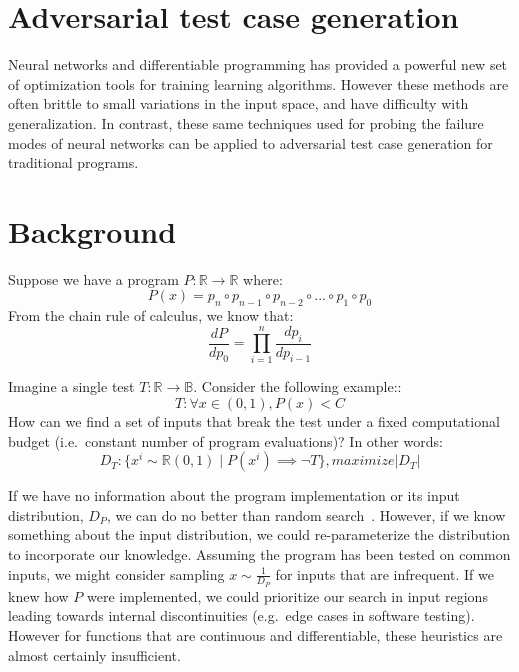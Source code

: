\documentclass[12pt,initial,twoside,maitrise]{dms}
\numberwithin{equation}{section}
\numberwithin{table}{chapter}
\numberwithin{figure}{chapter}
\begin{document}
\section{Adversarial test case generation}

Neural networks and differentiable programming has provided a powerful new set of optimization tools for training learning algorithms. However these methods are often brittle to small variations in the input space, and have difficulty with generalization. In contrast, these same techniques used for probing the failure modes of neural networks can be applied to adversarial test case generation for traditional programs.

\section{Background}

Suppose we have a program $P: \mathbb{R}\rightarrow\mathbb{R}$ where:
%
\begin{equation}
    P(x)=p_n \circ p_{n-1} \circ p_{n-2} \circ ... \circ p_1 \circ p_0
\end{equation}
%
From the chain rule of calculus, we know that:
%
\begin{equation}
    \frac{dP}{dp_0} = {\displaystyle \prod_{i=1}^{n} \frac{dp_{i}}{dp_{i-1}}}
\end{equation}

%
%
Imagine a single test $T: \mathbb{R} \rightarrow \mathbb{B}$. Consider the following example::
%
\begin{equation}
    T: \forall x \in (0, 1), P(x) < C
\end{equation}
%
How can we find a set of inputs that break the test under a fixed computational budget (i.e.\ constant number of program evaluations)? In other words:
%
\begin{equation}
    D_T: \{ x^i \sim \mathbb{R}(0, 1) \mid P(x^i) \implies \neg T \}, maximize |D_T|
\end{equation}
%

If we have no information about the program implementation or its input distribution, $D_P$, we can do no better than random search~\cite{wolpert1997no}. However, if we know something about the input distribution, we could re-parameterize the distribution to incorporate our knowledge. Assuming the program has been tested on common inputs, we might consider sampling $x \sim \frac{1}{D_P}$ for inputs that are infrequent. If we knew how $P$ were implemented, we could prioritize our search in input regions leading towards internal discontinuities (e.g.\ edge cases in software testing). However for functions that are continuous and differentiable, these heuristics are almost certainly insufficient.
\end{document}
